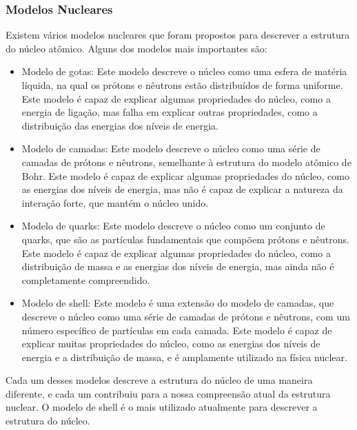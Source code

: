 \documentclass[11pt,a4paper]{article}
\begin{document}
            \subsubsection{Modelos Nucleares}
                
                Existem vários modelos nucleares que foram propostos para descrever a estrutura do núcleo atômico. Alguns dos modelos mais importantes são:

                \begin{itemize}

                    \item Modelo de gotas: Este modelo descreve o núcleo como uma esfera de matéria líquida, na qual os prótons e nêutrons estão distribuídos de forma uniforme. Este modelo é capaz de explicar algumas propriedades do núcleo, como a energia de ligação, mas falha em explicar outras propriedades, como a distribuição das energias dos níveis de energia.
                    
                    \item Modelo de camadas: Este modelo descreve o núcleo como uma série de camadas de prótons e nêutrons, semelhante à estrutura do modelo atômico de Bohr. Este modelo é capaz de explicar algumas propriedades do núcleo, como as energias dos níveis de energia, mas não é capaz de explicar a natureza da interação forte, que mantém o núcleo unido.
                    
                    \item Modelo de quarks: Este modelo descreve o núcleo como um conjunto de quarks, que são as partículas fundamentais que compõem prótons e nêutrons. Este modelo é capaz de explicar algumas propriedades do núcleo, como a distribuição de massa e as energias dos níveis de energia, mas ainda não é completamente compreendido.
                    
                    \item Modelo de shell: Este modelo é uma extensão do modelo de camadas, que descreve o núcleo como uma série de camadas de prótons e nêutrons, com um número específico de partículas em cada camada. Este modelo é capaz de explicar muitas propriedades do núcleo, como as energias dos níveis de energia e a distribuição de massa, e é amplamente utilizado na física nuclear.
                \end{itemize}

                Cada um desses modelos descreve a estrutura do núcleo de uma maneira diferente, e cada um contribuiu para a nossa compreensão atual da estrutura nuclear. O modelo de shell é o mais utilizado atualmente para descrever a estrutura do núcleo.
\end{document}
